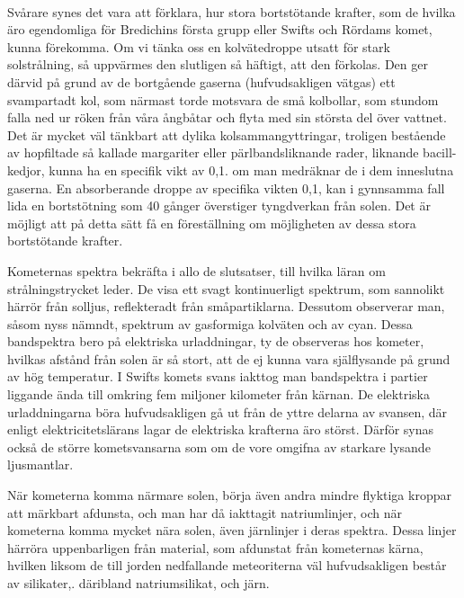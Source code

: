 \documentclass[a4paper, 12pt, oneside, swedish]{article}
\begin{document}
\paragraph{}
Svårare synes det vara att förklara, hur stora bortstötande krafter, som de hvilka äro egendomliga för Bredichins första grupp eller Swifts och Rördams komet, kunna förekomma. Om vi tänka oss en kolvätedroppe utsatt för stark solstrålning, så uppvärmes den slutligen så häftigt, att den förkolas. Den ger därvid på grund av de bortgående gaserna (hufvudsakligen vätgas) ett svampartadt kol, som närmast torde motsvara de små kolbollar, som stundom falla ned ur röken från våra ångbåtar och flyta med sin största del över vattnet. Det är mycket väl tänkbart att dylika kolsammangyttringar, troligen bestående av hopfiltade så kallade margariter eller pärlbandsliknande rader, liknande bacill-kedjor, kunna ha en specifik vikt av 0,1. om man medräknar de i dem inneslutna gaserna. En absorberande droppe av specifika vikten 0,1, kan i gynnsamma fall lida en bortstötning som 40 gånger överstiger tyngdverkan från solen. Det är möjligt att på detta sätt få en föreställning om möjligheten av dessa stora bortstötande krafter.

Kometernas spektra bekräfta i allo de slutsatser, till hvilka läran om strålningstrycket leder. De visa ett svagt kontinuerligt spektrum, som sannolikt härrör från solljus, reflekteradt från småpartiklarna. Dessutom observerar man, såsom nyss nämndt, spektrum av gasformiga kolväten och av cyan. Dessa bandspektra bero på elektriska urladdningar, ty de observeras hos kometer, hvilkas afstånd från solen är så stort, att de ej kunna vara själflysande på grund av hög temperatur. I Swifts komets svans iakttog man bandspektra i partier liggande ända till omkring fem miljoner kilometer från kärnan. De elektriska urladdningarna böra hufvudsakligen gå ut från de yttre delarna av svansen, där enligt elektricitetslärans lagar de elektriska krafterna äro störst. Därför synas också de större kometsvansarna som om de vore omgifna av starkare lysande ljusmantlar.

När kometerna komma närmare solen, börja även andra mindre flyktiga kroppar att märkbart afdunsta, och man har då iakttagit natriumlinjer, och när kometerna komma mycket nära solen, även järnlinjer i deras spektra. Dessa linjer härröra uppenbarligen från material, som afdunstat från kometernas kärna, hvilken liksom de till jorden nedfallande meteoriterna väl hufvudsakligen består av silikater,. däribland natriumsilikat, och järn.
\end{document}
